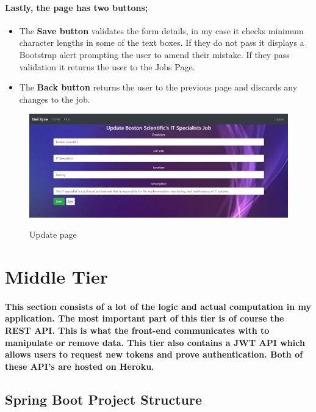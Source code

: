 \paragraph{Lastly, the page has two buttons;}
\begin{itemize}
    \item The \textbf{Save button} validates the form details, in my case it checks minimum character lengths in some of the text boxes. If they do not pass it displays a Bootstrap alert prompting the user to amend their mistake. If they pass validation it returns the user to the Jobs Page.
    \item The \textbf{Back button} returns the user to the previous page and discards any changes to the job.
\end{itemize}
\begin{figure}[ht]
    \centering
    \includegraphics[scale=0.3]{Images/update.png} 
    \label{update_label}
    \caption{Update page}
\end{figure}

\section{Middle Tier}
\paragraph{This section consists of a lot of the logic and actual computation in my application. The most important part of this tier is of course the REST API. This is what the front-end communicates with to manipulate or remove data. This tier also contains a JWT API which allows users to request new tokens and prove authentication. Both of these API's are hosted on Heroku.}

\subsection{Spring Boot Project Structure}
